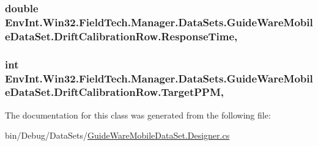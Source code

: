 \subsubsection[{Response\+Time}]{\setlength{\rightskip}{0pt plus 5cm}double Env\+Int.\+Win32.\+Field\+Tech.\+Manager.\+Data\+Sets.\+Guide\+Ware\+Mobile\+Data\+Set.\+Drift\+Calibration\+Row.\+Response\+Time\hspace{0.3cm}{\ttfamily [get]}, {\ttfamily [set]}}\label{class_env_int_1_1_win32_1_1_field_tech_1_1_manager_1_1_data_sets_1_1_guide_ware_mobile_data_set_1_1_drift_calibration_row_ab0ec96fa1f2598815e644b4687a34ebc}
\hypertarget{class_env_int_1_1_win32_1_1_field_tech_1_1_manager_1_1_data_sets_1_1_guide_ware_mobile_data_set_1_1_drift_calibration_row_ae071ed81fbbd7ee8e99e0fed5e4597ae}{}
\subsubsection[{Target\+P\+P\+M}]{\setlength{\rightskip}{0pt plus 5cm}int Env\+Int.\+Win32.\+Field\+Tech.\+Manager.\+Data\+Sets.\+Guide\+Ware\+Mobile\+Data\+Set.\+Drift\+Calibration\+Row.\+Target\+P\+P\+M\hspace{0.3cm}{\ttfamily [get]}, {\ttfamily [set]}}\label{class_env_int_1_1_win32_1_1_field_tech_1_1_manager_1_1_data_sets_1_1_guide_ware_mobile_data_set_1_1_drift_calibration_row_ae071ed81fbbd7ee8e99e0fed5e4597ae}


The documentation for this class was generated from the following file\+:\begin{DoxyCompactItemize}
\item 
bin/\+Debug/\+Data\+Sets/\hyperlink{bin_2_debug_2_data_sets_2_guide_ware_mobile_data_set_8_designer_8cs}{Guide\+Ware\+Mobile\+Data\+Set.\+Designer.\+cs}\end{DoxyCompactItemize}
